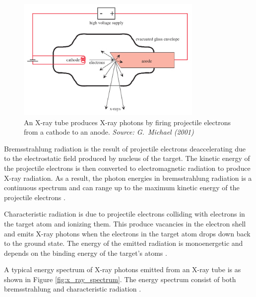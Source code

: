 \documentclass[12pt]{report}
\begin{document}
\begin{figure}
\centering
\includegraphics[width=0.8\textwidth]{figures/x_ray_tube.png}
\caption{An X-ray tube produces X-ray photons by firing projectile electrons from a cathode to an anode. \emph{Source: G.~Michael (2001) \cite{michael2001x}}}
\label{fig:x_ray_tube}
\end{figure}

Bremsstrahlung radiation is the result of projectile electrons deaccelerating due to the electrostatic field produced by nucleus of the target. The kinetic energy of the projectile electrons is then converted to electromagnetic radiation to produce X-ray radiation. As a result, the photon energies in bremsstrahlung radiation is  a continuous spectrum and can range up to the maximum kinetic energy of the projectile electrons \cite{michael2001x}.

Characteristic radiation is due to projectile electrons colliding with electrons in the target atom and ionizing them. This produce vacancies in the electron shell and emits X-ray photons when the electrons in the target atom drops down back to the ground state. The energy of the emitted radiation is monoenergetic and depends on the binding energy of the target's atoms \cite{michael2001x}.

A typical energy spectrum of X-ray photons emitted from an X-ray tube is as shown in Figure \ref{fig:x_ray_spectrum}. The energy spectrum consist of both bremsstrahlung and characteristic radiation \cite{michael2001x}.
\end{document}
